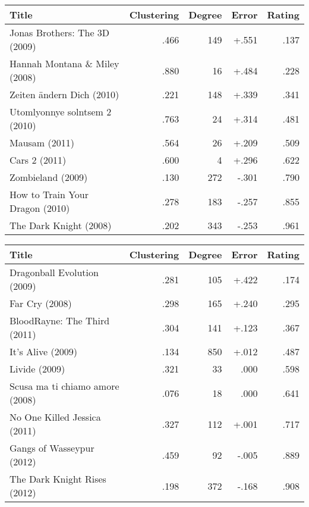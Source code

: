 \begin{table*}[!t]
\caption{\label{tab:errors_pred_rating}Errors in predictive results for ratings}

\begin{subtable}[b]{\textwidth}
\caption{\textbf{Predictor Misses}}
\centering
\begin{tabular}{lrrrr}
\toprule
Title                           & Clustering & Degree & Error  & Rating \\ \midrule
Jonas Brothers: The 3D (2009)   & .466       & 149    & +.551  & .137   \\
Hannah Montana \& Miley (2008)  & .880       & 16     & +.484  & .228   \\
Zeiten ändern Dich (2010)       & .221       & 148    & +.339  & .341   \\
Utomlyonnye solntsem 2 (2010)   & .763       & 24     & +.314  & .481   \\
Mausam (2011)                   & .564       & 26     & +.209  & .509   \\
Cars 2 (2011)                   & .600       & 4      & +.296  & .622   \\
Zombieland (2009)               & .130       & 272    & -.301  & .790   \\
How to Train Your Dragon (2010) & .278       & 183    & -.257  & .855   \\
The Dark Knight (2008)          & .202       & 343    & -.253  & .961   \\ \bottomrule
\end{tabular}
\end{subtable}

\vspace*{.5 cm}

\begin{subtable}[b]{\textwidth}
\caption{\textbf{Predictor Hits}}
\centering
\begin{tabular}{lrrrr}
\toprule
Title                           & Clustering & Degree & Error & Rating \\
\midrule
Dragonball Evolution (2009)     & .281       & 105    & +.422 & .174   \\
Far Cry (2008)                  & .298       & 165    & +.240 & .295   \\
BloodRayne: The Third (2011)    & .304       & 141    & +.123 & .367   \\
It's Alive (2009)               & .134       & 850    & +.012 & .487   \\
Livide (2009)                   & .321       & 33     &  .000 & .598   \\
Scusa ma ti chiamo amore (2008) & .076       & 18     &  .000 & .641   \\
No One Killed Jessica (2011)    & .327       & 112    & +.001 & .717   \\
Gangs of Wasseypur (2012)       & .459       & 92     & -.005 & .889   \\
The Dark Knight Rises (2012)    & .198       & 372    & -.168 & .908   \\
\bottomrule
\end{tabular}
\end{subtable}

\end{table*}
